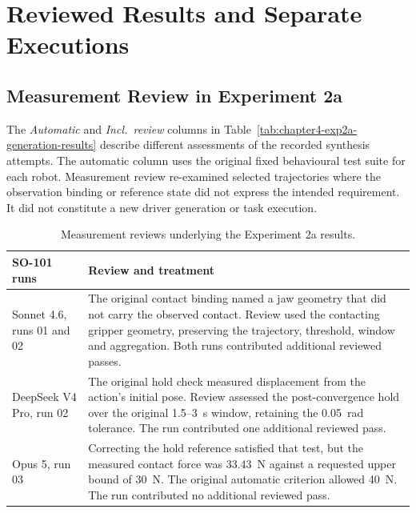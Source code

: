 \section{Reviewed Results and Separate Executions}
\label{sec:appendix-reviewed-results}

\subsection{Measurement Review in Experiment 2a}

The \emph{Automatic} and \emph{Incl.\ review} columns in
Table~\ref{tab:chapter4-exp2a-generation-results} describe different
assessments of the recorded synthesis attempts.
The automatic column uses the original fixed behavioural test suite for each robot.
Measurement review re-examined selected trajectories where the observation
binding or reference state did not express the intended requirement.
It did not constitute a new driver generation or task execution.

\begin{table}[htbp]
  \centering
  \begingroup
  \small
  \setlength{\tabcolsep}{4pt}
  \renewcommand{\arraystretch}{1.18}
  \caption{Measurement reviews underlying the Experiment 2a results.}
  \label{tab:appendix-exp2a-review}
  \begin{tabularx}{\textwidth}{@{}>{\raggedright\arraybackslash}p{34mm}
    >{\raggedright\arraybackslash}X@{}}
    \toprule
    \textbf{SO-101 runs} & \textbf{Review and treatment} \\
    \midrule
    Sonnet 4.6, runs 01 and 02 &
    The original contact binding named a jaw geometry that did not carry
    the observed contact. Review used the contacting gripper geometry,
    preserving the trajectory, threshold, window and aggregation.
    Both runs contributed additional reviewed passes. \\
    DeepSeek V4 Pro, run 02 &
    The original hold check measured displacement from the action's initial
    pose. Review assessed the post-convergence hold over the original
    1.5--3~s window, retaining the 0.05~rad tolerance.
    The run contributed one additional reviewed pass. \\
    Opus 5, run 03 &
    Correcting the hold reference satisfied that test, but the measured
    contact force was 33.43~N against a requested upper bound of 30~N.
    The original automatic criterion allowed 40~N.
    The run contributed no additional reviewed pass. \\
    \bottomrule
  \end{tabularx}
  \endgroup
\end{table}

